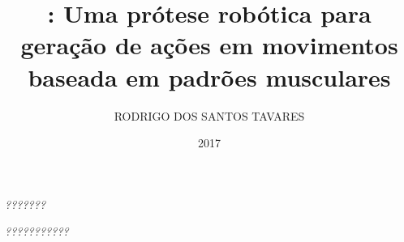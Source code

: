 \documentclass[
    12pt,       %
    oneside,    %
    a4paper,    %
%
    chapter=TITLE,	  	  %
%
    english,			  %
    brazil				  %
%
]{abntex2}
\title{\productname: Uma prótese robótica para geração de ações em movimentos baseada \todo{Trocar ``padrões musculares'' por outra coisa}em padrões musculares}
\author{RODRIGO DOS SANTOS TAVARES}
\date{2017}
\begin{document}


\imprimircapa{}

\imprimirfolhaderosto{}

\imprimirfolhadeaprovacao{}

\begin{dedicatoria}
   \vspace*{\fill}
   \centering
   \noindent
   \textit{???????} \vspace*{\fill}%
\end{dedicatoria}

\begin{agradecimentos}
  \textcolor{red}{\lipsum[1]}%
\end{agradecimentos}

\begin{epigrafe}
    \vspace*{\fill}
	\begin{flushright}
		\textit{???????????} %
	\end{flushright}
\end{epigrafe}
\end{document}
